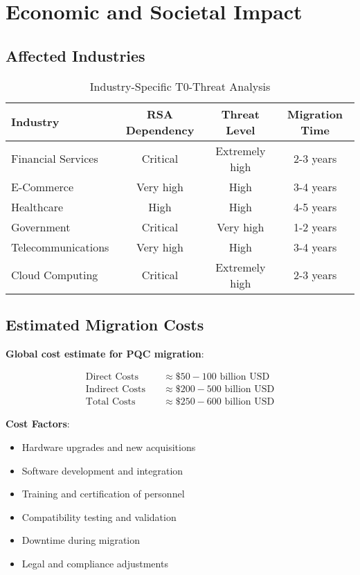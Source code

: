 \documentclass[12pt,a4paper]{article}
\begin{document}
	\section{Economic and Societal Impact}
	
	\subsection{Affected Industries}
	
	\begin{table}[htbp]
		\centering
		\begin{tabular}{lccc}
			\toprule
			\textbf{Industry} & \textbf{RSA Dependency} & \textbf{Threat Level} & \textbf{Migration Time} \\
			\midrule
			\rowcolor{red!30} Financial Services & Critical & Extremely high & 2-3 years \\
			\rowcolor{red!20} E-Commerce & Very high & High & 3-4 years \\
			\rowcolor{orange!30} Healthcare & High & High & 4-5 years \\
			\rowcolor{orange!20} Government & Critical & Very high & 1-2 years \\
			\rowcolor{yellow!30} Telecommunications & Very high & High & 3-4 years \\
			\rowcolor{yellow!20} Cloud Computing & Critical & Extremely high & 2-3 years \\
			\bottomrule
		\end{tabular}
		\caption{Industry-Specific T0-Threat Analysis}
		\label{tab:industry_impact}
	\end{table}
	
	\subsection{Estimated Migration Costs}
	
	\textbf{Global cost estimate for PQC migration}:
	
	\begin{align}
		\text{Direct Costs} \quad &\approx \$50-100 \text{ billion USD} \\
		\text{Indirect Costs} \quad &\approx \$200-500 \text{ billion USD} \\
		\text{Total Costs} \quad &\approx \$250-600 \text{ billion USD}
	\end{align}
	
	\textbf{Cost Factors}:
	\begin{itemize}
		\item Hardware upgrades and new acquisitions
		\item Software development and integration
		\item Training and certification of personnel
		\item Compatibility testing and validation
		\item Downtime during migration
		\item Legal and compliance adjustments
	\end{itemize}
	
\end{document}
